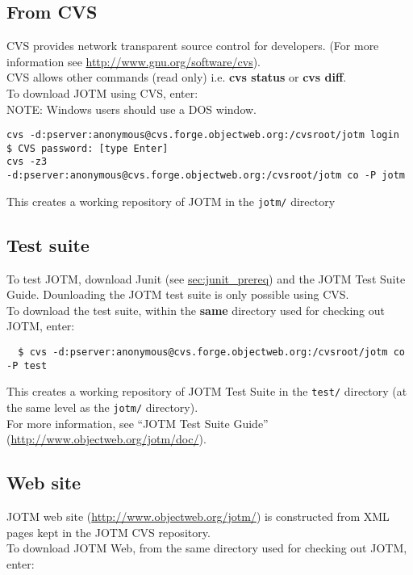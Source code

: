 \documentclass[a4paper,11pt]{article}
\begin{document}
\subsection{From CVS}
\label{sec:cvs_install}
CVS provides network transparent source control for developers. 
(For more information see \url{http://www.gnu.org/software/cvs}).\\
CVS allows other commands (read only) i.e. \textbf{cvs status} or
\textbf{cvs diff}.\\
To download JOTM using CVS, enter:\\
NOTE: Windows users should use a DOS window.
\begin{verbatim}
cvs -d:pserver:anonymous@cvs.forge.objectweb.org:/cvsroot/jotm login 
$ CVS password: [type Enter]
cvs -z3 
-d:pserver:anonymous@cvs.forge.objectweb.org:/cvsroot/jotm co -P jotm 
\end{verbatim}

This creates a working repository of JOTM in the \texttt{jotm/}
directory

\subsection{Test suite}
\label{sec:test_install}
To test JOTM, download Junit 
(see \hyperref{JUnit}{section}{}{sec:junit_prereq}) and the 
JOTM Test Suite Guide. Dounloading the JOTM test suite is only possible using CVS.\\
To download the test suite, within the \textbf{same} directory used for checking out
 JOTM, enter:\\

\begin{verbatim}
  $ cvs -d:pserver:anonymous@cvs.forge.objectweb.org:/cvsroot/jotm co -P test
\end{verbatim}
This creates a working repository of JOTM Test Suite in the
\texttt{test/} directory (at the same level as the \texttt{jotm/} directory).\\
For more information, see ``JOTM Test Suite Guide'' (\url{http://www.objectweb.org/jotm/doc/}).

\subsection{Web site}
\label{sec:web_install}
JOTM web site (\url{http://www.objectweb.org/jotm/}) is constructed
from XML pages kept in the JOTM CVS repository.\\
To download JOTM Web, from the same directory used for checking out JOTM, enter:\\
\end{document}
